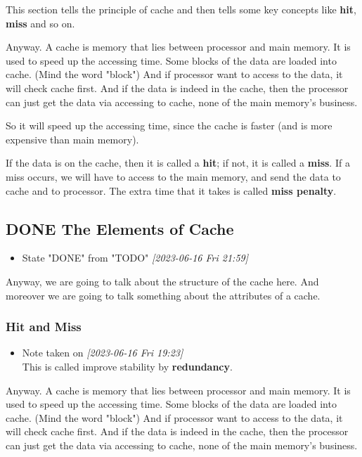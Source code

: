 \documentclass[11pt]{article}
\begin{document}
This section tells the principle of cache and then tells some key concepts like \textbf{hit}, \textbf{miss} and so on.

Anyway. A cache is memory that lies between processor and main memory. It is used to speed up the accessing time. Some blocks of the data are loaded into cache. (Mind the word "block") And if processor want to access to the data, it will check cache first. And if the data is indeed in the cache, then the processor can just get the data via accessing to cache, none of the main memory's business. 

So it will speed up the accessing time, since the cache is faster (and is more expensive than main memory).

If the data is on the cache, then it is called a \textbf{hit}; if not, it is called a \textbf{miss}. If a miss occurs, we will have to access to the main memory, and send the data to cache and to processor. The extra time that it takes is called \textbf{miss penalty}.

\subsection{{\bfseries\sffamily DONE} The Elements of Cache}
\label{sec:orga4e4a9f}
\begin{itemize}
\item State "DONE"       from "TODO"       \textit{[2023-06-16 Fri 21:59]}
\end{itemize}
Anyway, we are going to talk about the structure of the cache here. And moreover we are going to talk something about the attributes of a cache.

\subsubsection{Hit and Miss}
\label{sec:orgead817f}

\begin{itemize}
\item Note taken on \textit{[2023-06-16 Fri 19:23] } \\
This is called improve stability by \textbf{redundancy}.
\end{itemize}

Anyway. A cache is memory that lies between processor and main memory. It is used to speed up the accessing time. Some blocks of the data are loaded into cache. (Mind the word "block") And if processor want to access to the data, it will check cache first. And if the data is indeed in the cache, then the processor can just get the data via accessing to cache, none of the main memory's business. 
\end{document}
